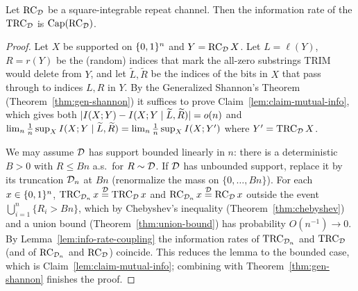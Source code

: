 
\begin{lemma}
  \label{lem:trim-rate}
  Let $\mathrm{RC}_{\mathcal{D}}$ be a square-integrable repeat channel. Then the information
  rate of the $\mathrm{TRC}_{\mathcal{D}}$ is $\mathrm{Cap}(\mathrm{RC}_{\mathcal{D}})$.
\end{lemma}
\begin{proof}
  Let $X$ be supported on $\{0,1\}^n$ and $Y=\mathrm{RC}_{\mathcal{D}}\,X$. Let $L=\ell(Y)$,
  $R=r(Y)$ be the (random) indices that mark the all-zero substrings TRIM would
  delete from $Y$, and let $\widetilde L,\widetilde R$ be the indices of the bits
  in $X$ that pass through to indices $L,R$ in $Y$. By the Generalized Shannon's
  Theorem (Theorem~\ref{thm:gen-shannon}) it suffices to prove
  Claim~\ref{lem:claim-mutual-info}, which gives both
  $|I(X;Y)-I(X;Y\mid\widetilde L,\widetilde R)|=o(n)$ and
  $\lim_n\tfrac1n\sup_X I(X;Y\mid\widetilde L,\widetilde R)
   = \lim_n\tfrac1n\sup_X I(X;Y')$ where $Y'=\mathrm{TRC}_{\mathcal{D}}\,X$.

  We may assume $\mathcal{D}$ has support bounded linearly in $n$: there is a
  deterministic $B>0$ with $R\le Bn$ a.s.\ for $R\sim\mathcal{D}$. If $\mathcal{D}$ has
  unbounded support, replace it by its truncation $\mathcal{D}_n$ at $Bn$ (renormalize
  the mass on $\{0,\dots,Bn\}$). For each $x\in\{0,1\}^n$, $\mathrm{TRC}_{\mathcal{D}_n}\,x
  \overset{\mathcal{D}}{=}\mathrm{TRC}_{\mathcal{D}}\,x$ and $\mathrm{RC}_{\mathcal{D}_n}\,x\overset{\mathcal{D}}{=}
  \mathrm{RC}_{\mathcal{D}}\,x$ outside the event $\bigcup_{i=1}^n\{R_i>Bn\}$, which by
  Chebyshev's inequality (Theorem~\ref{thm:chebyshev}) and a union bound
  (Theorem~\ref{thm:union-bound}) has probability $O(n^{-1})\to0$. By
  Lemma~\ref{lem:info-rate-coupling} the information rates of $\mathrm{TRC}_{\mathcal{D}_n}$ and
  $\mathrm{TRC}_{\mathcal{D}}$ (and of $\mathrm{RC}_{\mathcal{D}_n}$ and $\mathrm{RC}_{\mathcal{D}}$) coincide. This reduces the
  lemma to the bounded case, which is Claim~\ref{lem:claim-mutual-info}; combining
  with Theorem~\ref{thm:gen-shannon} finishes the proof.
\end{proof}

